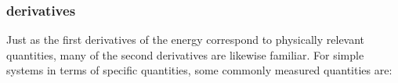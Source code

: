 \documentclass[twocolumn,10pt]{asme2ej}
\begin{document}
\subsubsection{ derivatives}
Just as the first derivatives of the energy correspond to physically relevant quantities, many of the second derivatives are likewise familiar. For simple systems in terms of specific quantities, some commonly measured quantities are:
\end{document}
